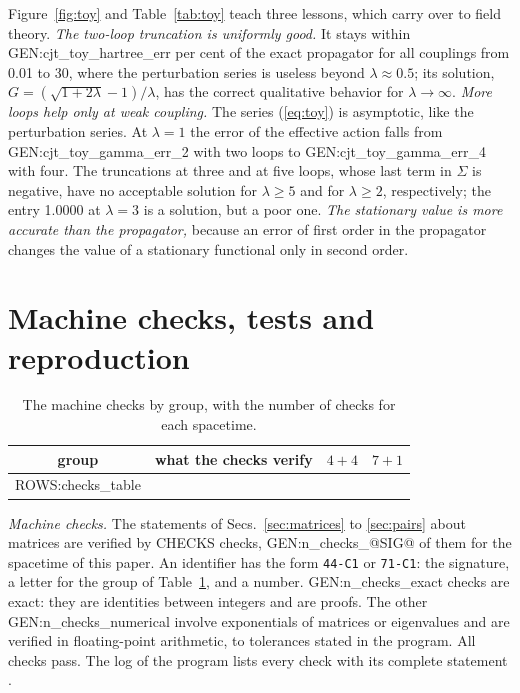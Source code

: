 Figure~\ref{fig:toy} and Table~\ref{tab:toy} teach three lessons, which carry over to field theory.
\emph{The two-loop truncation is uniformly good.} It stays within {{GEN:cjt_toy_hartree_err}} per
cent of the exact propagator for all couplings from 0.01 to 30, where the perturbation series is
useless beyond $\lambda\approx0.5$; its solution, $G=(\sqrt{1+2\lambda}-1)/\lambda$, has the correct
qualitative behavior for $\lambda\to\infty$. \emph{More loops help only at weak coupling.} The
series (\ref{eq:toy}) is asymptotic, like the perturbation series. At $\lambda=1$ the error of the
effective action falls from {{GEN:cjt_toy_gamma_err_2}} with two loops to
{{GEN:cjt_toy_gamma_err_4}} with four. The truncations at three and at five loops, whose last term
in $\Sigma$ is negative, have no acceptable solution for $\lambda\ge5$ and for $\lambda\ge2$,
respectively; the entry 1.0000 at $\lambda=3$ is a solution, but a poor one. \emph{The stationary
value is more accurate than the propagator,} because an error of first order in the propagator
changes the value of a stationary functional only in second order.

\section{Machine checks, tests and reproduction}
\label{app:checks}

\begin{table}
\caption{\label{tab:checks}The machine checks by group, with the number of checks for each spacetime.}
\begin{ruledtabular}
\begin{tabular}{c>{\raggedright\arraybackslash}p{}cc}
group & what the checks verify & $4+4$ & $7+1$ \\
\hline
{{ROWS:checks_table}}
\end{tabular}
\end{ruledtabular}
\end{table}

\emph{Machine checks.} The statements of Secs.~\ref{sec:matrices} to \ref{sec:pairs} about matrices
are verified by {{CHECKS}} checks, {{GEN:n_checks_@SIG@}} of them for the spacetime of this paper.
An identifier has the form \texttt{44-C1} or \texttt{71-C1}: the signature, a letter for the group
of Table~\ref{tab:checks}, and a number. {{GEN:n_checks_exact}} checks are exact: they are
identities between integers and are proofs. The other {{GEN:n_checks_numerical}} involve
exponentials of matrices or eigenvalues and are verified in floating-point arithmetic, to tolerances
stated in the program. All checks pass. The log of the program lists every check with its complete
statement \cite{SpacetimesRepo}.


